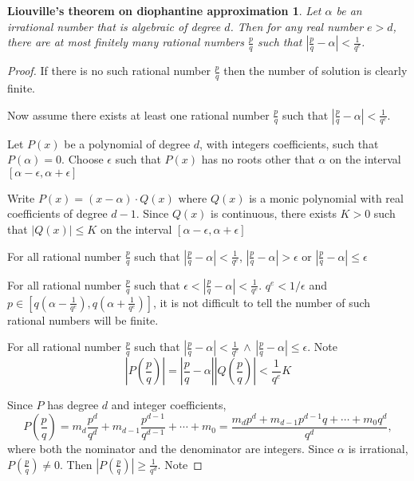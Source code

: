 \documentclass{article}
\newtheorem*{thm}{Liouville's theorem on diophantine approximation}
\theoremstyle{definition}\newtheorem{definition}{Definition}
\begin{document}
	\begin{thm}
		Let $\alpha$ be an irrational number that is algebraic of degree $d$. Then for any real number $e > d$, there are at most finitely many rational numbers $\frac { { p } } { q }$ such that $\left| \frac { p } { q } - \alpha \right| < \frac { 1 } { q ^ { e } }$.
	\end{thm}
	
	\begin{proof}
		If there is no such rational number $\frac { { p } } { q }$ then the number of solution is clearly finite.
		
		Now assume there exists at least one rational number $\frac { { p } } { q }$ such that $\left| \frac { p } { q } - \alpha \right| < \frac { 1 } { q ^ { e } }$.
		
		Let $P(x)$ be a polynomial of degree $d$, with integers coefficients, such that $P(\alpha)=0$. Choose $\epsilon$ such that $P(x)$ has no roots other that $\alpha$ on the interval $[\alpha - \epsilon, \alpha + \epsilon]$
		
		Write $P(x)=(x-\alpha) \cdot Q(x)$ where $Q(x)$ is a monic polynomial with real coefficients of degree $d-1$. Since $Q(x)$ is continuous, there exists $K>0$ such that $|Q(x)| \leq K$ on the interval $[\alpha - \epsilon, \alpha + \epsilon]$
		
		For all rational number $\frac { { p } } { q }$ such that $\left| \frac { p } { q } - \alpha \right| < \frac { 1 } { q ^ { e } }$, $\left| \frac { p } { q } - \alpha \right|>\epsilon$ or $\left| \frac { p } { q } - \alpha \right| \leq \epsilon$
		
		For all rational number $\frac { { p } } { q }$ such that $\epsilon < \left| \frac { p } { q } - \alpha \right| < \frac { 1 } { q ^ { e } }$. $q^e< 1/\epsilon$ and $p \in [q(\alpha - \frac { 1 } { q ^ { e } }), q(\alpha + \frac { 1 } { q ^ { e } })]$, it is not difficult to tell the number of such rational numbers will be finite.
		
		For all rational number $\frac { { p } } { q }$ such that $\left| \frac { p } { q } - \alpha \right| < \frac { 1 } { q ^ { e } } \, \land \, \left| \frac { p } { q } - \alpha \right| \leq \epsilon$. Note
		$$
		\left| P \left( \frac { p } { q } \right) \right| = \left|  \frac { p } { q } - \alpha \right| \left| Q \left( \frac { p } { q } \right) \right| < \frac { 1 } { q ^ { e } } K 
		$$
		
		Since $P$ has degree $d$ and integer coefficients, 
		$$P ( \frac { p } { q } )=m_d\frac { p^d } { q^d }+m_{d-1}\frac { p^{d-1} } { q^{d-1} }+\cdots+m_0=\frac{m_d p^d+ m_{d-1} p^{d-1} q+\cdots+m_0q^d}{q^d},$$ 
		where both the nominator and the denominator are integers. Since $\alpha$ is irrational, $P ( \frac { p } { q } ) \neq 0$. Then $\left| P \left( \frac { p } { q } \right) \right| \geq \frac { 1 } { q ^ { d } }$. Note


\end{proof}
\end{document}
